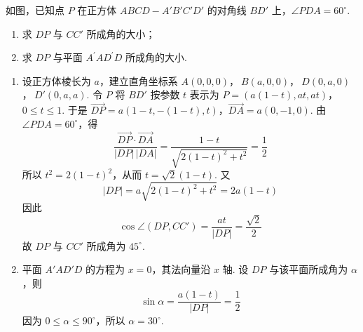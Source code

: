 \begin{problem}
如图，已知点 \(P\) 在正方体 \(ABCD - A'B'C'D'\) 的对角线 \(BD'\) 上，\(\angle PDA = 60^\circ\).

\begin{enumerate}
\item 求 \(DP\) 与 \(CC'\) 所成角的大小；
\item 求 \(DP\) 与平面 \(A^{\prime}AD^{\prime}D\) 所成角的大小.
\end{enumerate}


\begin{solution}
\begin{enumerate}
\item 设正方体棱长为 \(a\)，建立直角坐标系
\(A\left(0,0,0\right)\)，\(\ B\left(a,0,0\right)\)，\(\ D\left(0,a,0\right)\)，\(\ D'\left(0,a,a\right)\).
令 \(P\) 将 \(BD'\) 按参数 \(t\) 表示为
\(P=\left(a\left(1-t\right),at,at\right)\)，\(0\le t\le1\).
于是
\(\overrightarrow{DP}=a\left(1-t,-(1-t),t\right)\)，\(\overrightarrow{DA}=a\left(0,-1,0\right)\).
由 \(\angle PDA=60^{\circ}\)，得
\[
\frac{\overrightarrow{DP}\cdot\overrightarrow{DA}}{|DP|\,|DA|}
=\frac{1-t}{\sqrt{2\left(1-t\right)^2+t^2}}=\frac12
\]
所以 \(t^2=2\left(1-t\right)^2\)，从而 \(t=\sqrt2\left(1-t\right)\). 又
\[
|DP|=a\sqrt{2\left(1-t\right)^2+t^2}=2a(1-t)
\]
因此
\[
\cos\angle\left(DP,CC'\right)=\frac{at}{|DP|}=\frac{\sqrt2}{2}
\]
故 \(DP\) 与 \(CC'\) 所成角为 \(45^{\circ}\).
\item 平面 \(A'AD'D\) 的方程为 \(x=0\)，其法向量沿 \(x\) 轴. 设 \(DP\) 与该平面所成角为 \(\alpha\)，则
\[
\sin\alpha=\frac{a(1-t)}{|DP|}=\frac12
\]
因为 \(0\le\alpha\le90^{\circ}\)，所以 \(\alpha=30^{\circ}\).
\end{enumerate}
\end{solution}
\end{problem}

